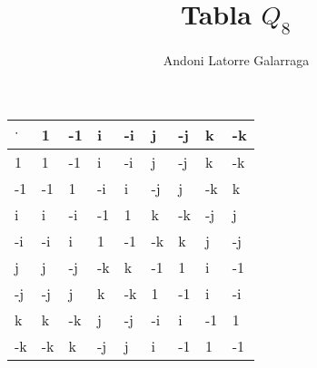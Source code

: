 \documentclass{article}
\title{Tabla $Q_8$}
\author{Andoni Latorre Galarraga}
\date{}
\begin{document}
\maketitle

    \begin{tabular}{|l|llllllll}
    \hline
     $\cdot$ & \multicolumn{1}{l|}{1} & \multicolumn{1}{l|}{-1} & \multicolumn{1}{l|}{i} & \multicolumn{1}{l|}{-i} & \multicolumn{1}{l|}{j} & \multicolumn{1}{l|}{-j} & \multicolumn{1}{l|}{k} & \multicolumn{1}{l|}{-k} \\ \hline
    1                    & 1                      & -1                      & i                      & -i                      & j                      & -j                      & k                      & -k                      \\ \cline{1-1}
    -1                   & -1                     & 1                       & -i                     & i                       & -j                     & j                       & -k                     & k                       \\ \cline{1-1}
    i                    & i                      & -i                      & -1                     & 1                       & k                      & -k                      & -j                     & j                       \\ \cline{1-1}
    -i                   & -i                     & i                       & 1                      & -1                      & -k                     & k                       & j                      & -j                      \\ \cline{1-1}
    j                    & j                      & -j                      & -k                     & k                       & -1                     & 1                       & i                      & -1                      \\ \cline{1-1}
    -j                   & -j                     & j                       & k                      & -k                      & 1                      & -1                      & i                      & -i                      \\ \cline{1-1}
    k                    & k                      & -k                      & j                      & -j                      & -i                     & i                       & -1                     & 1                       \\ \cline{1-1}
    -k                   & -k                     & k                       & -j                     & j                       & i                      & -1                      & 1                      & -1                      \\ \cline{1-1}
    \end{tabular}
\end{document}
